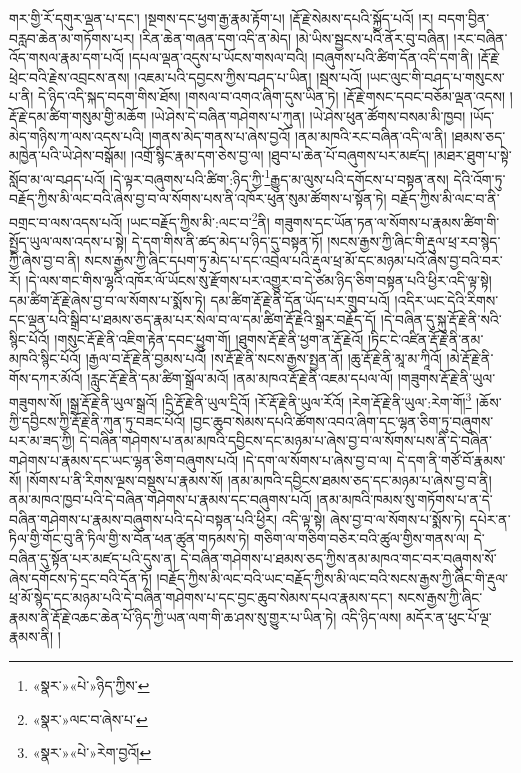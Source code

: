 གར་གྱི་རོ་དགུར་ལྡན་པ་དང་། །སྔགས་དང་ཕྱག་རྒྱ་རྣམ་རྟོག་པ། །རྡོ་རྗེ་སེམས་དཔའི་སྐྱོད་པའོ། །ར། བདག་བྱིན་བརླབ་ཆེན་མ་གཏོགས་པར། །རིན་ཆེན་གཞན་དག་འདི་ན་མེད། །མེ་ཡིས་སྦྱངས་པའི་ནོར་བུ་བཞིན། །རང་བཞིན་འོད་གསལ་རྣམ་དག་པའོ། །དཔལ་ལྡན་འདུས་པ་ཡོངས་གསལ་བའི། །བཞུགས་པའི་ཚིག་དོན་འདི་དག་ནི། །རྡོ་རྗེ་ཕྲེང་བའི་རྗེས་འབྲངས་ནས། །འཇམ་པའི་དབྱངས་ཀྱིས་བཤད་པ་ཡིན། །སྦས་པའོ། །ཡང་ལུང་གི་བཤད་པ་གསུངས་པ་ནི། དེ་ཉིད་འདི་སྐད་བདག་གིས་ཐོས། །གསལ་བ་འགའ་ཞིག་དུས་ཡིན་ཏེ། །རྡོ་རྗེ་གསང་དབང་བཅོམ་ལྡན་འདས། །རྡོ་རྗེ་དམ་ཚིག་གསུམ་གྱི་མཆོག །ཡེ་ཤེས་དེ་བཞིན་གཤེགས་པ་ཀུན། །ཡེ་ཤེས་ཕུན་ཚོགས་བསམ་མི་ཁྱབ། །ཡོད་མེད་གཉིས་ཀ་ལས་འདས་པའི། །གནས་མེད་གནས་པ་ཞེས་བྱའོ། །ནམ་མཁའི་རང་བཞིན་འདི་ལ་ནི། །ཐམས་ཅད་མཁྱེན་པའི་ཡེ་ཤེས་བསྒོམ། །འགྲོ་སྙིང་རྣམ་དག་ཅེས་བྱ་ལ། །ཐུབ་པ་ཆེན་པོ་བཞུགས་པར་མཛད། །མཐར་ཐུག་པ་སྟེ་སློབ་མ་ལ་བཤད་པའོ། །དེ་ལྟར་བཞུགས་པའི་ཚིག་:ཉིད་ཀྱི་\footnote{«སྣར་»«པེ་»ཉིད་ཀྱིས་}རྒྱུད་མ་ལུས་པའི་དགོངས་པ་བསྟན་ནས། དེའི་འོག་ཏུ་བརྗོད་ཀྱིས་མི་ལང་བའི་ཞེས་བྱ་བ་ལ་སོགས་པས་ནི་འཁོར་ཕུན་སུམ་ཚོགས་པ་སྟོན་ཏེ། བརྗོད་ཀྱིས་མི་ལང་བ་ནི་བགྲང་བ་ལས་འདས་པའོ། །ཡང་བརྗོད་ཀྱིས་མི་:ལང་བ་\footnote{«སྣར་»ལང་བ་ཞེས་པ་}ནི། གཟུགས་དང་ཡོན་ཏན་ལ་སོགས་པ་རྣམས་ཚིག་གི་སྤྱོད་ཡུལ་ལས་འདས་པ་སྟེ། དེ་དག་གིས་ནི་ཚད་མེད་པ་ཉིད་དུ་བསྟན་ཏོ། །སངས་རྒྱས་ཀྱི་ཞིང་གི་རྡུལ་ཕྲ་རབ་སྙེད་ཀྱི་ཞེས་བྱ་བ་ནི། སངས་རྒྱས་ཀྱི་ཞིང་དཔག་ཏུ་མེད་པ་དང་འབྲེལ་པའི་རྡུལ་ཕྲ་མོ་དང་མཉམ་པའོ་ཞེས་བྱ་བའི་བར་རོ། །དེ་ལས་གང་གིས་ལྷའི་འཁོར་ལོ་ཡོངས་སུ་རྫོགས་པར་འགྱུར་བ་དེ་ཙམ་ཉིད་ཅིག་བསྟན་པའི་ཕྱིར་འདི་ལྟ་སྟེ། དམ་ཚིག་རྡོ་རྗེ་ཞེས་བྱ་བ་ལ་སོགས་པ་སྨོས་ཏེ། དམ་ཚིག་རྡོ་རྗེ་ནི་དོན་ཡོད་པར་གྲུབ་པའོ། །འདིར་ཡང་དེའི་རིགས་དང་ལྡན་པའི་སྒྲིབ་པ་ཐམས་ཅད་རྣམ་པར་སེལ་བ་ལ་དམ་ཚིག་རྡོ་རྗེའི་སྒྲར་བརྗོད་དོ། །དེ་བཞིན་དུ་སྐུ་རྡོ་རྗེ་ནི་སའི་སྙིང་པོའོ། །གསུང་རྡོ་རྗེ་ནི་འཇིག་རྟེན་དབང་ཕྱུག་གོ། །ཐུགས་རྡོ་རྗེ་ནི་ཕྱག་ན་རྡོ་རྗེའོ། །ཏིང་ངེ་འཛིན་རྡོ་རྗེ་ནི་ནམ་མཁའི་སྙིང་པོའོ། །རྒྱལ་བ་རྡོ་རྗེ་ནི་བྱམས་པའོ། །ས་རྡོ་རྗེ་ནི་སངས་རྒྱས་སྤྱན་ནོ། །ཆུ་རྡོ་རྗེ་ནི་མཱ་མ་ཀཱིའོ། །མེ་རྡོ་རྗེ་ནི་གོས་དཀར་མོའོ། །རླུང་རྡོ་རྗེ་ནི་དམ་ཚིག་སྒྲོལ་མའོ། །ནམ་མཁའ་རྡོ་རྗེ་ནི་འཇམ་དཔལ་ལོ། །གཟུགས་རྡོ་རྗེ་ནི་ཡུལ་གཟུགས་སོ། །སྒྲ་རྡོ་རྗེ་ནི་ཡུལ་སྒྲའོ། །དྲི་རྡོ་རྗེ་ནི་ཡུལ་དྲིའོ། །རོ་རྡོ་རྗེ་ནི་ཡུལ་རོའོ། །རེག་རྡོ་རྗེ་ནི་ཡུལ་:རེག་གོ།\footnote{«སྣར་»«པེ་»རེག་བྱའོ།} །ཆོས་ཀྱི་དབྱིངས་ཀྱི་རྡོ་རྗེ་ནི་ཀུན་ཏུ་བཟང་པོའོ། །བྱང་ཆུབ་སེམས་དཔའི་ཚོགས་འབའ་ཞིག་དང་ལྷན་ཅིག་ཏུ་བཞུགས་པར་མ་ཟད་ཀྱི། དེ་བཞིན་གཤེགས་པ་ནམ་མཁའི་དབྱིངས་དང་མཉམ་པ་ཞེས་བྱ་བ་ལ་སོགས་པས་ནི་དེ་བཞིན་གཤེགས་པ་རྣམས་དང་ཡང་ལྷན་ཅིག་བཞུགས་པའོ། །དེ་དག་ལ་སོགས་པ་ཞེས་བྱ་བ་ལ། དེ་དག་ནི་གཙོ་བོ་རྣམས་སོ། །སོགས་པ་ནི་རིགས་ལྔས་བསྡུས་པ་རྣམས་སོ། །ནམ་མཁའི་དབྱིངས་ཐམས་ཅད་དང་མཉམ་པ་ཞེས་བྱ་བ་ནི། ནམ་མཁའ་ཁྱབ་པའི་དེ་བཞིན་གཤེགས་པ་རྣམས་དང་བཞུགས་པའོ། །ནམ་མཁའི་ཁམས་སུ་གཏོགས་པ་ན་དེ་བཞིན་གཤེགས་པ་རྣམས་བཞུགས་པའི་དཔེ་བསྟན་པའི་ཕྱིར། འདི་ལྟ་སྟེ། ཞེས་བྱ་བ་ལ་སོགས་པ་སྨོས་ཏེ། དཔེར་ན་ཏིལ་གྱི་གོང་བུ་ནི་ཏིལ་གྱི་ས་བོན་ཕན་ཚུན་གཏམས་ཏེ། གཅིག་ལ་གཅིག་བཅེར་བའི་ཚུལ་གྱིས་གནས་ལ། དེ་བཞིན་དུ་སྟོན་པར་མཛད་པའི་དུས་ན། དེ་བཞིན་གཤེགས་པ་ཐམས་ཅད་ཀྱིས་ནམ་མཁའ་གང་བར་བཞུགས་སོ་ཞེས་དགོངས་ཏེ་དྲང་བའི་དོན་ཏོ། །བརྗོད་ཀྱིས་མི་ལང་བའི་ཡང་བརྗོད་ཀྱིས་མི་ལང་བའི་སངས་རྒྱས་ཀྱི་ཞིང་གི་རྡུལ་ཕྲ་མོ་སྙེད་དང་མཉམ་པའི་དེ་བཞིན་གཤེགས་པ་དང་བྱང་ཆུབ་སེམས་དཔའ་རྣམས་དང་། སངས་རྒྱས་ཀྱི་ཞིང་རྣམས་ནི་རྡོ་རྗེ་འཆང་ཆེན་པོ་ཉིད་ཀྱི་ཡན་ལག་གི་ཆ་ཤས་སུ་གྱུར་པ་ཡིན་ཏེ། འདི་ཉིད་ལས། མདོར་ན་ཕུང་པོ་ལྔ་རྣམས་ནི། །
